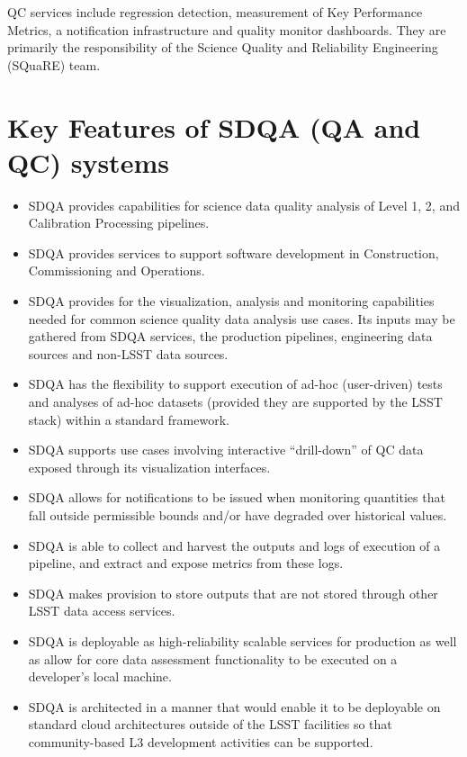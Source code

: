 \documentclass[DM,toc,lsstdraft]{lsstdoc}
\begin{document}
QC services include regression detection, measurement of Key Performance Metrics, a notification infrastructure and quality monitor dashboards. They are primarily the responsibility of the Science Quality and Reliability Engineering (SQuaRE) team.

\section{Key Features of SDQA (QA and QC) systems}

\begin{itemize}
\item SDQA provides capabilities for science data quality analysis of Level 1, 2, and Calibration Processing pipelines.

\item SDQA provides services to support software development in Construction, Commissioning and Operations.

\item SDQA provides for the visualization, analysis and monitoring capabilities needed for common science quality data analysis use cases. Its inputs may be gathered from SDQA services, the production pipelines, engineering data sources and non-LSST data sources.

\item SDQA has the flexibility to support execution of ad-hoc (user-driven) tests and analyses of ad-hoc datasets (provided they are supported by the LSST stack) within a standard framework.

\item SDQA supports use cases involving interactive ``drill-down'' of QC data exposed through its visualization interfaces.

\item SDQA allows for notifications to be issued when monitoring quantities that fall outside permissible bounds and/or have degraded over historical values.

\item SDQA is able to collect and harvest the outputs and logs of execution of a pipeline, and extract and expose metrics from these logs.

\item SDQA makes provision to store outputs that are not stored through other LSST data access services.

\item SDQA is deployable as high-reliability scalable services for production as well as allow for core data assessment functionality to be executed on a developer's local machine.

\item SDQA is architected in a manner that would enable it to be deployable on standard cloud architectures outside of the LSST facilities so that community-based L3 development activities can be supported.

\end{itemize}
\end{document}
